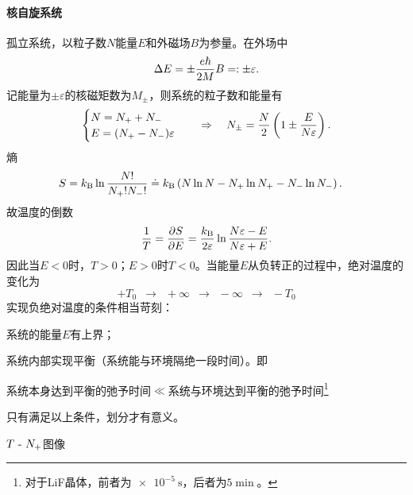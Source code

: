\paragraph*{核自旋系统}孤立系统，以粒子数$N$能量$E$和外磁场$B$为参量。在外场中
\[
	\Delta E=\pm\frac{e\hbar}{2M}B=:\pm\varepsilon.
\]
记能量为$\pm\varepsilon$的核磁矩数为$M_\pm$，则系统的粒子数和能量有
\begin{align*}
	\begin{cases}
		N=N_++N_- \\
		E=(N_+-N_-)\varepsilon
	\end{cases}\quad\Rightarrow\quad
	N_\pm=\frac N2\left(1\pm\frac E{N\varepsilon}\right).
\end{align*}
熵
\begin{align*}
	S & =k_{\mathrm B}\ln\frac{N!}{N_+!N_-!}\doteq k_{\mathrm B}\left(N\ln N-N_+\ln N_+-N_-\ln N_-\right).
\end{align*}
故温度的倒数
\begin{align}
	\frac 1T=\frac{\partial^{\;\!\!}S}{\partial E^{\;\!\!}}=\frac{k_{\mathrm B}}{2\varepsilon}\ln\frac{N\varepsilon-E}{N\varepsilon+E}.
\end{align}
因此当$E<0$时，$T>0$；$E>0$时$T<0$。当能量$E$从负转正的过程中，绝对温度的变化为
\[
	+T_0\enspace\longrightarrow\enspace+\infty\enspace\to\enspace -\infty\enspace\longrightarrow\enspace-T_0
\]
实现负绝对温度的条件相当苛刻：
\begin{compactenum}
	\item 系统的能量$E$有上界；
	\item 系统内部实现平衡（系统能与环境隔绝一段时间）。即

	      系统本身达到平衡的弛予时间$\ll$系统与环境达到平衡的弛予时间\footnote{对于LiF晶体，前者为$\SI{e-5}\s$，后者为$\SI{5}\min$。}
\end{compactenum}
只有满足以上条件，划分才有意义。
\begin{center}
	\tikzchap $T~\text{-}~ N_+$图像
\end{center}
\clearpage
